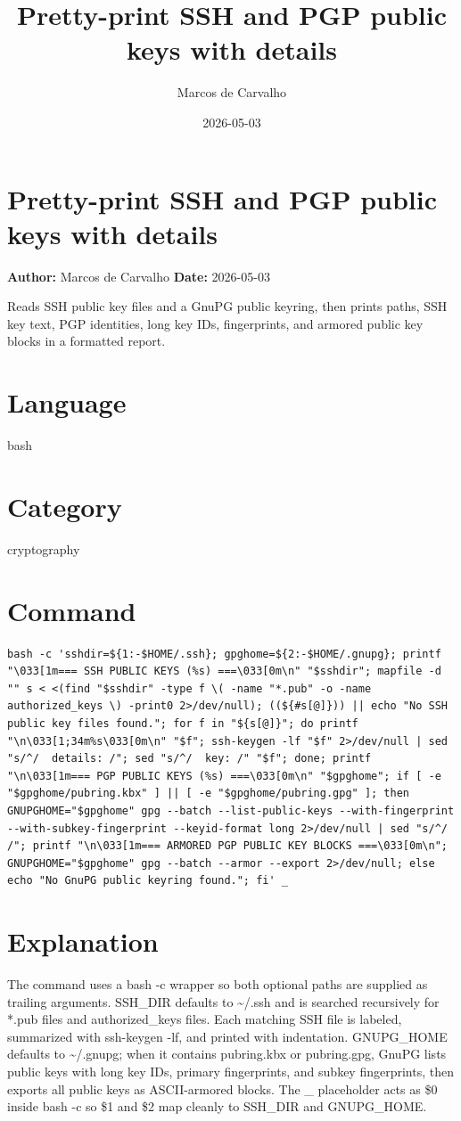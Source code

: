 \documentclass{article}
\title{Pretty-print SSH and PGP public keys with details}
\author{Marcos de Carvalho}
\date{2026-05-03}
\begin{document}
\section*{Pretty-print SSH and PGP public keys with details}
\textbf{Author:} Marcos de Carvalho \hfill \textbf{Date:} 2026-05-03

\noindent Reads SSH public key files and a GnuPG public keyring, then prints paths, SSH key text, PGP identities, long key IDs, fingerprints, and armored public key blocks in a formatted report.

\section*{Language}
bash

\section*{Category}
cryptography

\section*{Command}
\begin{lstlisting}
bash -c 'sshdir=${1:-$HOME/.ssh}; gpghome=${2:-$HOME/.gnupg}; printf "\033[1m=== SSH PUBLIC KEYS (%s) ===\033[0m\n" "$sshdir"; mapfile -d "" s < <(find "$sshdir" -type f \( -name "*.pub" -o -name authorized_keys \) -print0 2>/dev/null); ((${#s[@]})) || echo "No SSH public key files found."; for f in "${s[@]}"; do printf "\n\033[1;34m%s\033[0m\n" "$f"; ssh-keygen -lf "$f" 2>/dev/null | sed "s/^/  details: /"; sed "s/^/  key: /" "$f"; done; printf "\n\033[1m=== PGP PUBLIC KEYS (%s) ===\033[0m\n" "$gpghome"; if [ -e "$gpghome/pubring.kbx" ] || [ -e "$gpghome/pubring.gpg" ]; then GNUPGHOME="$gpghome" gpg --batch --list-public-keys --with-fingerprint --with-subkey-fingerprint --keyid-format long 2>/dev/null | sed "s/^/  /"; printf "\n\033[1m=== ARMORED PGP PUBLIC KEY BLOCKS ===\033[0m\n"; GNUPGHOME="$gpghome" gpg --batch --armor --export 2>/dev/null; else echo "No GnuPG public keyring found."; fi' _
\end{lstlisting}

\section*{Explanation}
The command uses a bash -c wrapper so both optional paths are supplied as trailing arguments. SSH\_DIR defaults to \textasciitilde{}/.ssh and is searched recursively for *.pub files and authorized\_keys files. Each matching SSH file is labeled, summarized with ssh-keygen -lf, and printed with indentation. GNUPG\_HOME defaults to \textasciitilde{}/.gnupg; when it contains pubring.kbx or pubring.gpg, GnuPG lists public keys with long key IDs, primary fingerprints, and subkey fingerprints, then exports all public keys as ASCII-armored blocks. The \_ placeholder acts as \$0 inside bash -c so \$1 and \$2 map cleanly to SSH\_DIR and GNUPG\_HOME.
\end{document}
